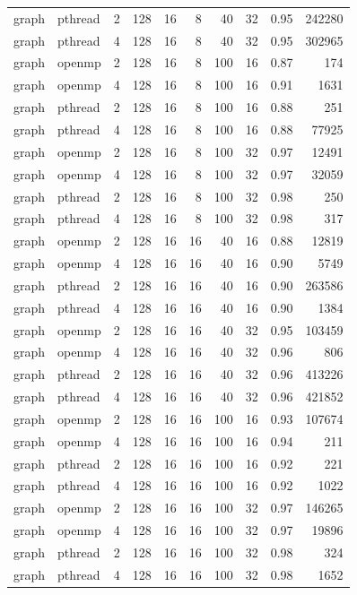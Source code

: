 \documentclass[a4paper]{article}
\begin{document}
{\begin{longtable}{lllrrrrrrr}
graph & pthread & 2 & 128 & 16 & 8 & 40 & 32 & 0.95 & 242280 \\
graph & pthread & 4 & 128 & 16 & 8 & 40 & 32 & 0.95 & 302965 \\
graph & openmp & 2 & 128 & 16 & 8 & 100 & 16 & 0.87 & 174 \\
graph & openmp & 4 & 128 & 16 & 8 & 100 & 16 & 0.91 & 1631 \\
graph & pthread & 2 & 128 & 16 & 8 & 100 & 16 & 0.88 & 251 \\
graph & pthread & 4 & 128 & 16 & 8 & 100 & 16 & 0.88 & 77925 \\
graph & openmp & 2 & 128 & 16 & 8 & 100 & 32 & 0.97 & 12491 \\
graph & openmp & 4 & 128 & 16 & 8 & 100 & 32 & 0.97 & 32059 \\
graph & pthread & 2 & 128 & 16 & 8 & 100 & 32 & 0.98 & 250 \\
graph & pthread & 4 & 128 & 16 & 8 & 100 & 32 & 0.98 & 317 \\
graph & openmp & 2 & 128 & 16 & 16 & 40 & 16 & 0.88 & 12819 \\
graph & openmp & 4 & 128 & 16 & 16 & 40 & 16 & 0.90 & 5749 \\
graph & pthread & 2 & 128 & 16 & 16 & 40 & 16 & 0.90 & 263586 \\
graph & pthread & 4 & 128 & 16 & 16 & 40 & 16 & 0.90 & 1384 \\
graph & openmp & 2 & 128 & 16 & 16 & 40 & 32 & 0.95 & 103459 \\
graph & openmp & 4 & 128 & 16 & 16 & 40 & 32 & 0.96 & 806 \\
graph & pthread & 2 & 128 & 16 & 16 & 40 & 32 & 0.96 & 413226 \\
graph & pthread & 4 & 128 & 16 & 16 & 40 & 32 & 0.96 & 421852 \\
graph & openmp & 2 & 128 & 16 & 16 & 100 & 16 & 0.93 & 107674 \\
graph & openmp & 4 & 128 & 16 & 16 & 100 & 16 & 0.94 & 211 \\
graph & pthread & 2 & 128 & 16 & 16 & 100 & 16 & 0.92 & 221 \\
graph & pthread & 4 & 128 & 16 & 16 & 100 & 16 & 0.92 & 1022 \\
graph & openmp & 2 & 128 & 16 & 16 & 100 & 32 & 0.97 & 146265 \\
graph & openmp & 4 & 128 & 16 & 16 & 100 & 32 & 0.97 & 19896 \\
graph & pthread & 2 & 128 & 16 & 16 & 100 & 32 & 0.98 & 324 \\
graph & pthread & 4 & 128 & 16 & 16 & 100 & 32 & 0.98 & 1652 \\

\end{longtable}}
\end{document}
